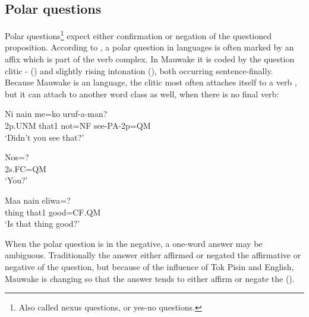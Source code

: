 





\subsection{  Polar questions}
{}
Polar questions\footnote{Also called nexus questions, or yes-no questions.} expect either confirmation or negation of the questioned proposition. According to \citet[63]{Wurm1982}, a polar question in  languages is often marked by an affix which is part of the verb complex. In Mauwake it is coded by the question clitic -  () and slightly rising intonation (), both occurring sentence-finally.  Because Mauwake is an  language, the clitic most often attaches itself to a verb , but it can attach to another word class as well, when there is no final verb:

\ea%
\label{ex:x1179}
\gll Ni  nain  me=ko  uruf-a-man? \\
2p.UNM  that1  not=NF  see-PA-2p=QM   \\
\glt `Didn't you see that?'
\z





\ea%
\label{ex:x1180}
\gll Nos=? \\
2s.FC=QM      \\
\glt `You?'
\z





\ea%
\label{ex:x1181}
\gll Maa  nain  eliwa=? \\
thing  that1  good=CF.QM      \\
\glt `Is that thing good?'
\z





When the polar question is in the negative, a one-word answer may be ambiguous. Traditionally the answer either affirmed or negated the affirmative or negative  of the question, but because of the influence of Tok Pisin and English, Mauwake is changing so that the answer tends to either affirm or negate the  ().

